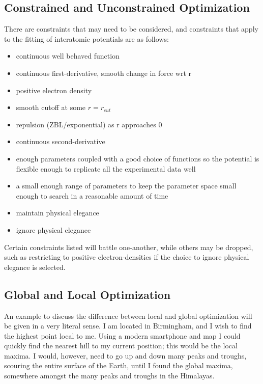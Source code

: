 \subsection{Constrained and Unconstrained Optimization}

There are constraints that may need to be considered, and constraints that apply to the fitting of interatomic potentials are as follows:

\begin{itemize}
\item continuous well behaved function
\item continuous first-derivative, smooth change in force wrt r
\item positive electron density
\item smooth cutoff at some $r = r_{cut}$
\item repulsion (ZBL/exponential) as r approaches 0
\item continuous second-derivative
\item enough parameters coupled with a good choice of functions so the potential is flexible enough to replicate all the experimental data well
\item a small enough range of parameters to keep the parameter space small enough to search in a reasonable amount of time
\item maintain physical elegance
\item ignore physical elegance
\end{itemize}

Certain constraints listed will battle one-another, while others may be dropped, such as restricting to positive electron-densities if the choice to ignore physical elegance is selected. 


\subsection{Global and Local Optimization}

An example to discuss the difference between local and global optimization will be given in a very literal sense.  I am located in Birmingham, and I wish to find the highest point local to me.  Using a modern smartphone and map I could quickly find the nearest hill to my current position; this would be the local maxima.  I would, however, need to go up and down many peaks and troughs, scouring the entire surface of the Earth, until I found the global maxima, somewhere amongst the many peaks and troughs in the Himalayas. 

